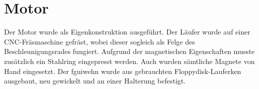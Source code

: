 \section{Motor}
Der Motor wurde als Eigenkonstruktion ausgeführt. Der Läufer wurde auf einer CNC-Fräsmaschine gefräst, wobei dieser sogleich als Felge des Beschleunigungsrades fungiert. Aufgrund der magnetischen Eigenschaften musste zusätzlich ein Stahlring eingepresst werden. Auch wurden sämtliche Magnete von Hand eingesetzt. Der fguiwehn wurde aus gebrauchten Floppydisk-Lauferken ausgebaut, neu gewickelt und an einer Halterung befestigt.